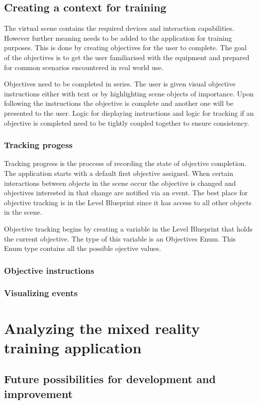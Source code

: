 \documentclass[12pt, a4paper,oneside, nocenter]{thesis}
\begin{document}
\section{Creating a context for training}
The virtual scene contains the required devices and interaction capabilities. However further meaning needs to be added to the application for training purposes. This is done by creating objectives for the user to complete. The goal of the objectives is to get the user familiarised with the equipment and prepared for common scenarios encountered in real world use.
\par
Objectives need to be completed in series. The user is given visual objective instructions either with text or by highlighting scene objects of importance. Upon following the instructions the objective is complete and another one will be presented to the user. Logic for displaying instructions and logic for tracking if an objective is completed need to be tightly coupled together to ensure consistency.
\subsection{Tracking progess}
Tracking progress is the proccess of recording the state of objective completion. The application starts with a default first objective assigned. When certain interactions between objects in the scene occur the objective is changed and objectives interested in that change are notified via an event. The best place for objective tracking is in the Level Blueprint since it has access to all other objects in the scene.
\par
Objective tracking begins by creating a variable in the Level Blueprint that holds the current objective. The type of this variable is an Objectives Enum. This Enum type contains all the possible ojective values.
\subsection{Objective instructions}
\subsection{Visualizing events}
\par
\chapter{\texorpdfstring{Analyzing the mixed reality training application}{analysis-mixedr}}

\section{Future possibilities for development and improvement}


\newpage

\nocite{*}

\end{document}
